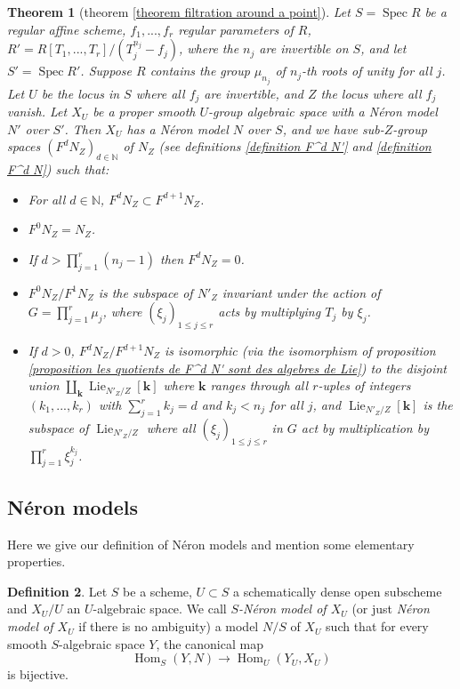 \documentclass{article}
\newcommand{\N}{\mathbb{N}}
\DeclareMathOperator{\spec}{Spec}
\DeclareMathOperator{\Hom}{Hom}
\DeclareMathOperator{\lie}{Lie}
\newtheorem{thm}{Theorem}[section]
\theoremstyle{definition}
\newtheorem{defi}[thm]{Definition}
\theoremstyle{remark}
\begin{document}
\begin{thm}[theorem \ref{theorem filtration around a point}]
Let $S=\spec R$ be a regular affine scheme, $f_1,...,f_r$ regular parameters of $R$, $R'=R[T_1,...,T_r]/(T_j^{n_j}-f_j)$, where the $n_j$ are invertible on $S$, and let $S'=\spec R'$. Suppose $R$ contains the group $\mu_{n_j}$ of $n_j$-th roots of unity for all $j$. Let $U$ be the locus in $S$ where all $f_j$ are invertible, and $Z$ the locus where all $f_j$ vanish. Let $X_U$ be a proper smooth $U$-group algebraic space with a N\'eron model $N'$ over $S'$. Then $X_U$ has a N\'eron model $N$ over $S$, and we have sub-$Z$-group spaces $(F^d N_Z)_{d\in\N}$ of $N_Z$ (see definitions \ref{definition F^d N'} and \ref{definition F^d N}) such that:
\begin{itemize}
\item For all $d\in\N$, $F^d N_Z\subset F^{d+1} N_Z$.
\item $F^0 N_Z=N_Z$.
\item If $d>\prod\limits_{j=1}^r (n_j-1)$ then $F^d N_Z=0$.
\item $F^0 N_Z/F^1 N_Z$ is the subspace of $N'_Z$ invariant under the action of $G=\prod\limits_{j=1}^r \mu_j$, where $(\xi_j)_{1\leq j\leq r}$ acts by multiplying $T_j$ by $\xi_j$.
\item If $d>0$, $F^d N_Z/F^{d+1} N_Z$ is isomorphic (via the isomorphism of proposition \ref{proposition les quotients de F^d N' sont des algebres de Lie}) to the disjoint union $\coprod\limits_\mathbf{k}\lie_{N'_Z/Z}[\mathbf{k}]$ where $\mathbf{k}$ ranges through all $r$-uples of integers $(k_1,...,k_r)$ with $\sum\limits_{j=1}^r k_j=d$ and $k_j<n_j$ for all $j$, and $\lie_{N'_Z/Z}[\mathbf{k}]$ is the subspace of $\lie_{N'_Z/Z}$ where all $(\xi_j)_{1\leq j\leq r}$ in $G$ act by multiplication by $\prod\limits_{j=1}^r \xi_j^{k_j}$.
\end{itemize}
\end{thm}


	
	\subsection{N\'eron models}
	Here we give our definition of N\'eron models and mention some elementary properties.
\begin{defi}
Let $S$ be a scheme, $U\subset S$ a schematically dense open subscheme and $X_U/U$ an $U$-algebraic space. We call \emph{$S$-N\'eron model of $X_U$} (or just \emph{N\'eron model of $X_U$} if there is no ambiguity) a model $N/S$ of $X_U$ such that for every smooth $S$-algebraic space $Y$, the canonical map
\[
\Hom_S(Y,N)\longrightarrow\Hom_U(Y_U,X_U)
\]
is bijective.
\end{defi}
\end{document}

